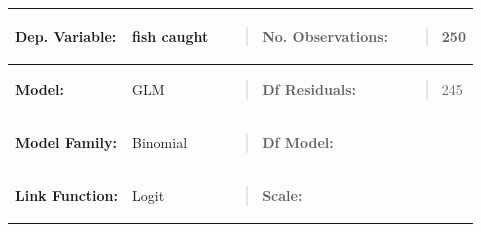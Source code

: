 {\def\LTcaptype{none} %
\begin{longtable}[]{@{}
  >{\raggedright\arraybackslash}p{}
  >{\centering\arraybackslash}p{}
  >{\raggedright\arraybackslash}p{}
  >{\raggedright\arraybackslash}p{}@{}}
\toprule\noalign{}
\begin{minipage}[b]{\linewidth}\raggedright
\textbf{Dep. Variable:}
\end{minipage} & \begin{minipage}[b]{\linewidth}\centering
fish caught
\end{minipage} & \begin{minipage}[b]{\linewidth}\raggedright
\begin{quote}
\textbf{No. Observations:}
\end{quote}
\end{minipage} & \begin{minipage}[b]{\linewidth}\raggedright
\begin{quote}
250
\end{quote}
\end{minipage} \\
\midrule\noalign{}
\endhead
\bottomrule\noalign{}
\endlastfoot
\textbf{Model:} & GLM & \begin{minipage}[t]{\linewidth}\raggedright
\begin{quote}
\textbf{Df Residuals:}
\end{quote}
\end{minipage} & \begin{minipage}[t]{\linewidth}\raggedright
\begin{quote}
245
\end{quote}
\end{minipage} \\
\textbf{Model Family:} & Binomial &
\begin{minipage}[t]{\linewidth}\raggedright
\begin{quote}
\textbf{Df Model:}
\end{quote}
\end{minipage} & 4 \\
\textbf{Link Function:} & Logit &
\begin{minipage}[t]{\linewidth}\raggedright
\begin{quote}
\textbf{Scale:}
\end{quote}
\end{minipage} & \begin{minipage}[t]{\linewidth}\raggedright

\end{minipage}
\end{longtable}}
